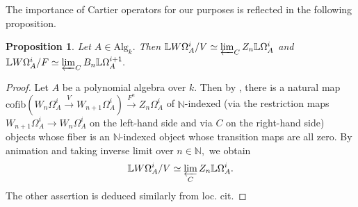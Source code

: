 \documentclass[10pt,letterpaper]{amsart}
\numberwithin{figure}{section}
\numberwithin{equation}{section}
\newtheorem{corollary}[figure]{Corollary}
\newtheorem{proposition}[figure]{Proposition}
\theoremstyle{definition}
\theoremstyle{definition}
\theoremstyle{definition}
\theoremstyle{definition}
\newcommand{\LL}{\L}
\renewcommand{\L}{\mathbb{L}}
\newcommand{\Z}{\mathbf{Z}}
\begin{document}






The importance of Cartier operators for our purposes is reflected in the following proposition.


\begin{proposition}\label{llll}
    Let $A \in \mathrm{Alg}_k.$ Then $ \LL W \Omega^i_A/ V \simeq \varprojlim_{C} Z_n \LL \Omega^i_A$ and $\LL W\Omega^i_A/ F \simeq \varprojlim_{C} B_{n} \LL \Omega^{i+1}_A.$
\end{proposition}{}

\begin{proof}
Let $A$ be a polynomial algebra over $k.$ Then by \cite[Prop. 3.11]{Luc1}, there is a natural map $\mathrm{cofib}(W_{n} \Omega^i_A \xrightarrow{V} W_{n+1} \Omega^i_A  ) \xrightarrow{F^n} Z_n  \Omega^i_A$ of $\mathbb{N}$-indexed (via the restriction maps $W_{n+1}\Omega^i_A \to W_{n}\Omega^i_A$ on the left-hand side and via $C$ on the right-hand side) objects whose fiber is an $\mathbb{N}$-indexed object whose transition maps are all zero. By animation and taking inverse limit over $n \in \mathbb{N},$ we obtain $$ \LL W \Omega^i_A/ V \simeq \varprojlim_{C} Z_n \LL \Omega^i_A.$$ The other assertion is deduced similarly from loc. cit.
\end{proof}{}
\end{document}
